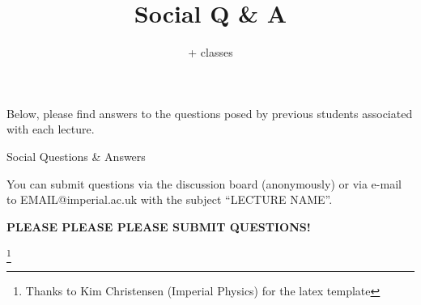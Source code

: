 \documentclass[a4paper,11pt]{book}
\title{\lecture Social Q \& A}
\author{\lecturer + \lecture classes}
\makeatletter
\newcommand{\lecture}{LECTURE NAME\xspace}
\newcommand{\qemail}{EMAIL@imperial.ac.uk\xspace}
\makeatother
\begin{document}
\maketitle

\noindent Below, please find answers to the questions posed by previous students associated with each lecture. \\

{\Large \bf \red

\begin{center}
Social Questions \& Answers \\
\end{center}

\vspace*{0.5cm}
You can submit questions via the discussion board (anonymously) or via e-mail to \qemail with the subject ``\lecture''.

\vspace*{0.5cm}
\begin{center}
{\bf \red PLEASE PLEASE PLEASE SUBMIT QUESTIONS!}
\end{center}}

\footnote{Thanks to Kim Christensen (Imperial Physics) for the latex template}



\end{document}
